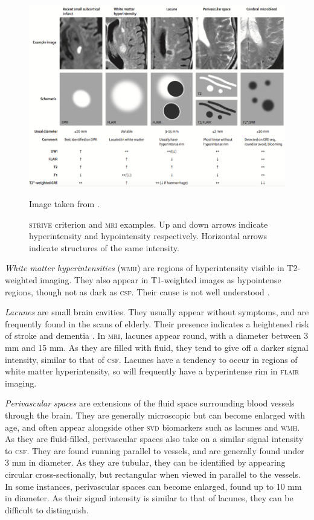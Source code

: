 \begin{figure}[ht]
	\centering
	\includegraphics[width = \textwidth]{Images/2_STRIVE.png}
	\caption{\textsc{strive} criterion and \textsc{mri} examples. Up and down arrows indicate hyperintensity and hypointensity respectively. Horizontal arrows indicate structures of the same intensity.}
	\small Image taken from \cite{WardlawJ.M.2013Nsfr}.
	\label{svd-biomarkers-fig}
\end{figure}

\textit{White matter hyperintensities} (\textsc{wmh}) are regions of hyperintensity visible in T2-weighted imaging. They also appear in T1-weighted images as hypointense regions, though not as dark as \textsc{csf}. Their cause is not well understood \cite{Gouw2011}.

\textit{Lacunes} are small brain cavities. They usually appear without symptoms, and are frequently found in the scans of elderly. Their presence indicates a heightened risk of stroke and dementia \cite{BenjaminJ.Philip2018LIbN,VanDerFlierM.Wiesje2005SVDa}. In \textsc{mri}, lacunes appear round, with a diameter between 3 mm and 15 mm. As they are filled with fluid, they tend to give off a darker signal intensity, similar to that of \textsc{csf}. Lacunes have a tendency to occur in regions of white matter hyperintensity, so will frequently have a hyperintense rim in \textsc{flair} imaging.

\textit{Perivascular spaces} are extensions of the fluid space surrounding blood vessels through the brain. They are generally microscopic but can become enlarged with age, and often appear alongside other \textsc{svd} biomarkers such as lacunes and \textsc{wmh}. As they are fluid-filled, perivascular spaces also take on a similar signal intensity to \textsc{csf}. They are found running parallel to vessels, and are generally found under 3 mm in diameter. As they are tubular, they can be identified by appearing circular cross-sectionally, but rectangular when viewed in parallel to the vessels. In some instances, perivascular spaces can become enlarged, found up to 10 mm in diameter. As their signal intensity is similar to that of lacunes, they can be difficult to distinguish. 

